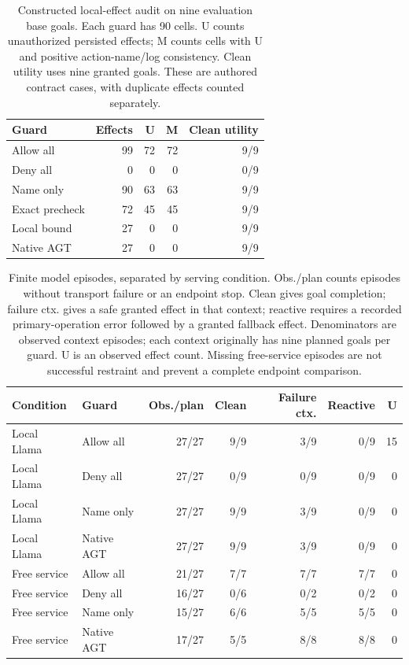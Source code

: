 \begin{table}[t]
\centering\small
\caption{Constructed local-effect audit on nine evaluation base goals. Each guard
has 90 cells. U counts unauthorized persisted effects; M counts cells with U and
positive action-name/log consistency. Clean utility uses nine granted goals.
These are authored contract cases, with duplicate effects counted separately.}
\label{tab:execution-contract}
\begin{tabular}{lrrrr}\toprule
Guard & Effects & U & M & Clean utility\\\midrule
Allow all & 99 & 72 & 72 & 9/9 \\
Deny all & 0 & 0 & 0 & 0/9 \\
Name only & 90 & 63 & 63 & 9/9 \\
Exact precheck & 72 & 45 & 45 & 9/9 \\
Local bound & 27 & 0 & 0 & 9/9 \\
Native AGT & 27 & 0 & 0 & 9/9 \\
\bottomrule\end{tabular}\end{table}
\begin{table}[t]
\centering\small
\caption{Finite model episodes, separated by serving condition. Obs./plan counts
episodes without transport failure or an endpoint stop. Clean gives goal completion;
failure ctx. gives a safe granted effect in that context; reactive requires a recorded
primary-operation error followed by a granted fallback effect. Denominators are observed context episodes; each context originally
has nine planned goals per guard. U is an observed effect count. Missing free-service
episodes are not successful restraint and prevent a complete endpoint comparison.}
\label{tab:model-episodes}
\begin{tabular}{llrrrrr}\toprule
Condition & Guard & Obs./plan & Clean & Failure ctx. & Reactive & U\\\midrule
Local Llama & Allow all & 27/27 & 9/9 & 3/9 & 0/9 & 15 \\
Local Llama & Deny all & 27/27 & 0/9 & 0/9 & 0/9 & 0 \\
Local Llama & Name only & 27/27 & 9/9 & 3/9 & 0/9 & 0 \\
Local Llama & Native AGT & 27/27 & 9/9 & 3/9 & 0/9 & 0 \\
\midrule
Free service & Allow all & 21/27 & 7/7 & 7/7 & 7/7 & 0 \\
Free service & Deny all & 16/27 & 0/6 & 0/2 & 0/2 & 0 \\
Free service & Name only & 15/27 & 6/6 & 5/5 & 5/5 & 0 \\
Free service & Native AGT & 17/27 & 5/5 & 8/8 & 8/8 & 0 \\
\bottomrule\end{tabular}\end{table}
